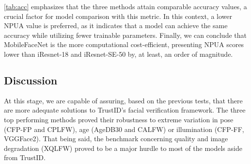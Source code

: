 \documentclass[class=report, crop=false, a4paper, 12pt]{standalone}
\begin{document}
\begin{table}[H]
    \centering
    \caption{Number of trainable parameters per unit of accuracy for the three highest achieving models.}
    \label{tab:param_acc}
\end{table}

\par \autoref{tab:acc} emphasizes that the three methods attain comparable accuracy values, a crucial factor for model comparison with this metric. In this context, a lower NPUA value is preferred, as it indicates that a model can achieve the same accuracy while utilizing fewer trainable parameters. Finally, we can conclude that MobileFaceNet is the more computational cost-efficient, presenting NPUA scores lower than iResnet-18 and iResnet-SE-50 by, at least, an order of magnitude.


\subsection{Discussion}
\par At this stage, we are capable of assuring, based on the previous tests, that there are more adequate solutions to TrustID's facial verification framework. The three top performing methods proved their robustness to extreme variation in pose (CFP-FP and CPLFW), age (AgeDB30 and CALFW) or illumination (CFP-FF, VGGFace2). That being said, the benchmark concerning quality and image degradation (XQLFW) proved to be a major hurdle to most of the models aside from TrustID.
\end{document}
